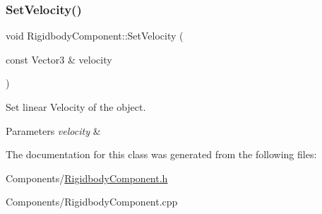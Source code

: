 \subsubsection{\texorpdfstring{Set\+Velocity()}{SetVelocity()}}
{\footnotesize\ttfamily void Rigidbody\+Component\+::\+Set\+Velocity (\begin{DoxyParamCaption}\item[{const Vector3 \&}]{velocity }\end{DoxyParamCaption})}



Set linear Velocity of the object. 


\begin{DoxyParams}{Parameters}
{\em velocity} & \\
\hline
\end{DoxyParams}


The documentation for this class was generated from the following files\+:\begin{DoxyCompactItemize}
\item 
Components/\hyperlink{RigidbodyComponent_8h}{Rigidbody\+Component.\+h}\item 
Components/Rigidbody\+Component.\+cpp\end{DoxyCompactItemize}
